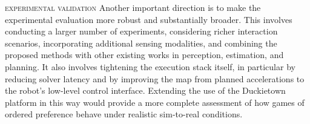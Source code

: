 \smallskip \noindent
\textsc{experimental validation} \quad
Another important direction is to make the experimental evaluation more
robust and substantially broader. This involves conducting a larger
number of experiments, considering richer interaction scenarios,
incorporating additional sensing modalities, and combining the proposed
methods with other existing works in perception, estimation, and
planning. It also involves tightening the execution stack itself, in
particular by reducing solver latency and by improving the map from
planned accelerations to the robot's low-level control interface.
Extending the use of the Duckietown platform in this way would provide a
more complete assessment of how games of ordered preference behave under
realistic sim-to-real conditions.
